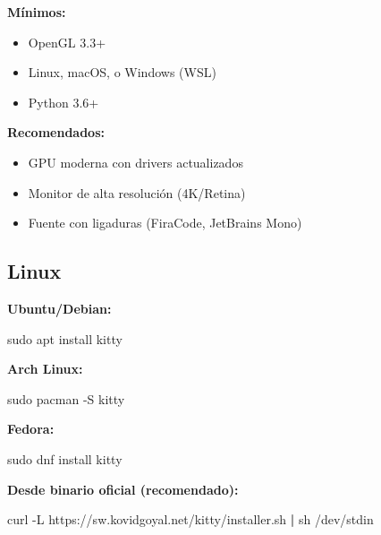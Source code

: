 \documentclass[
  doc,
  floatsintext,
  longtable,
  a4paper,
  nolmodern,
  notxfonts,
  notimes,
  12pt,
  colorlinks=true,linkcolor=blue,citecolor=blue,urlcolor=blue]{apa7}
\newenvironment{Shaded}{\begin{snugshade}}{\end{snugshade}}
\newcommand{\AttributeTok}[1]{\textcolor[rgb]{0.40,0.45,0.13}{#1}}
\newcommand{\ExtensionTok}[1]{\textcolor[rgb]{0.00,0.23,0.31}{#1}}
\newcommand{\FunctionTok}[1]{\textcolor[rgb]{0.28,0.35,0.67}{#1}}
\newcommand{\KeywordTok}[1]{\textcolor[rgb]{0.00,0.23,0.31}{\textbf{#1}}}
\newcommand{\NormalTok}[1]{\textcolor[rgb]{0.00,0.23,0.31}{#1}}
\providecommand{\tightlist}{%
  \setlength{\itemsep}{0pt}\setlength{\parskip}{0pt}}
\begin{document}
\textbf{Mínimos:}

\begin{itemize}
\tightlist
\item
  OpenGL 3.3+
\item
  Linux, macOS, o Windows (WSL)
\item
  Python 3.6+
\end{itemize}

\textbf{Recomendados:}

\begin{itemize}
\tightlist
\item
  GPU moderna con drivers actualizados
\item
  Monitor de alta resolución (4K/Retina)
\item
  Fuente con ligaduras (FiraCode, JetBrains Mono)
\end{itemize}

\subsection{Linux}\label{linux}

\textbf{Ubuntu/Debian:}

\begin{Shaded}
\begin{Highlighting}[]
\FunctionTok{sudo}\NormalTok{ apt install kitty}
\end{Highlighting}
\end{Shaded}

\textbf{Arch Linux:}

\begin{Shaded}
\begin{Highlighting}[]
\FunctionTok{sudo}\NormalTok{ pacman }\AttributeTok{{-}S}\NormalTok{ kitty}
\end{Highlighting}
\end{Shaded}

\textbf{Fedora:}

\begin{Shaded}
\begin{Highlighting}[]
\FunctionTok{sudo}\NormalTok{ dnf install kitty}
\end{Highlighting}
\end{Shaded}

\textbf{Desde binario oficial (recomendado):}

\begin{Shaded}
\begin{Highlighting}[]
\ExtensionTok{curl} \AttributeTok{{-}L}\NormalTok{ https://sw.kovidgoyal.net/kitty/installer.sh }\KeywordTok{|} \FunctionTok{sh}\NormalTok{ /dev/stdin}
\end{Highlighting}
\end{Shaded}
\end{document}
